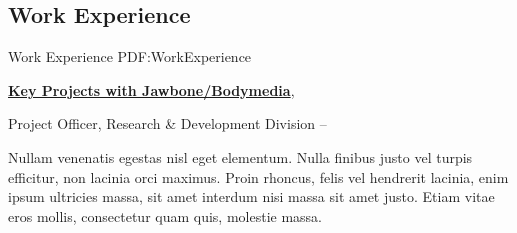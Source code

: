 \documentclass[letterpaper,MMMyyyy,nonstop]{simpleresumecv}
\begin{document}
\begin{body}
\iffalse 

\section
{Professional Affiliations\newline
\& Activities}
{Professional Affiliations \& Activities}
{PDF:ProfessionalAffiliationsActivities}

\href{http://www.example.com/my-society}
{\textbf{Society of Professional Earth Scientists}},
New York, USA

\GapNoBreak
\BulletItem
Member
\hfill
\DatestampY{2009} --
Present


\section
{Campus Activities}
{Campus Activities}
{PDF:CampusActivities}

\href{http://www.example.com/my-club}
{\textbf{First Volunteers Club}},
First American University

\GapNoBreak
\BulletItem
President
\hfill
\DatestampYMD{2006}{08}{15} --
\DatestampYMD{2007}{08}{15}
\begin{detail}
\SubBulletItem
Lorem ipsum dolor sit amet, consectetur adipiscing elit.
\SubBulletItem
Curabitur vitae laoreet velit, vel ultricies est. Nam nec elit ac ante facilisis ultrices.
\SubBulletItem
Integer sit amet turpis dolor. Lorem ipsum dolor sit amet, consectetur adipiscing elit. Nunc at orci eu leo vulputate finibus sed et sem.
\SubBulletItem
Suspendisse volutpat sapien et mi cursus, gravida ornare mauris sollicitudin.
\end{detail}

\fi

\section
{Work Experience}
{Work Experience}
{PDF:WorkExperience}

\href{http://www.jawbone.com}
{\textbf{Key Projects with Jawbone/Bodymedia}},

\GapNoBreak
\BulletItem
Project Officer,
Research \& Development Division
\hfill
{} --
\begin{detail}
\SubBulletItem
Nullam venenatis egestas nisl eget elementum.
\SubBulletItem
Nulla finibus justo vel turpis efficitur, non lacinia orci maximus. Proin rhoncus, felis vel hendrerit lacinia, enim ipsum ultricies massa, sit amet interdum nisi massa sit amet justo.
\SubBulletItem
Etiam vitae eros mollis, consectetur quam quis, molestie massa.
\end{detail}


\end{body}
\end{document}
